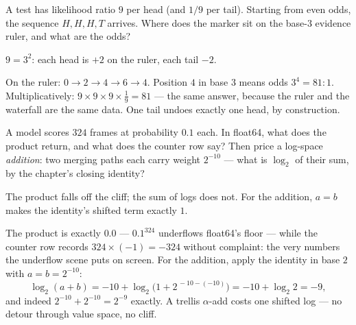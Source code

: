 \begin{problem}
A test has likelihood ratio $9$ per head (and $1/9$ per tail).
Starting from even odds, the sequence $H, H, H, T$ arrives. Where
does the marker sit on the base-$3$ evidence ruler, and what are the
odds?
\begin{hint}
$9 = 3^2$: each head is $+2$ on the ruler, each tail $-2$.
\end{hint}
\begin{solution}
On the ruler: $0 \to 2 \to 4 \to 6 \to 4$. Position $4$ in base $3$
means odds $3^4 = 81{:}1$. Multiplicatively:
$9 \times 9 \times 9 \times \tfrac19 = 81$ — the same answer, because
the ruler and the waterfall are the same data. One tail undoes
exactly one head, by construction.
\end{solution}
\end{problem}

\begin{problem}[stretch]
A model scores $324$ frames at probability $0.1$ each. In float64,
what does the product return, and what does the counter row say?
Then price a log-space \emph{addition}: two merging paths each carry
weight $2^{-10}$ — what is $\log_2$ of their sum, by the chapter's
closing identity?
\begin{hint}
The product falls off the cliff; the sum of logs does not. For the
addition, $a = b$ makes the identity's shifted term exactly $1$.
\end{hint}
\begin{solution}
The product is exactly $0.0$ — $0.1^{324}$ underflows float64's
floor — while the counter row records
$324 \times (-1) = -324$ without complaint: the very numbers the
underflow scene puts on screen. For the addition, apply the identity
in base $2$ with $a = b = 2^{-10}$:
\[
  \log_2(a + b) = -10 + \log_2\!\bigl(1 + 2^{\,-10 - (-10)}\bigr)
  = -10 + \log_2 2 = -9 ,
\]
and indeed $2^{-10} + 2^{-10} = 2^{-9}$ exactly. A trellis
$\alpha$-add costs one shifted log — no detour through value space,
no cliff.
\end{solution}
\end{problem}
